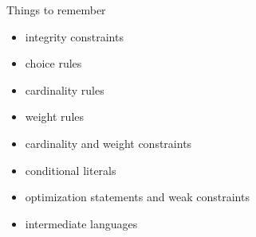\begin{frame}{Things to remember}
  \bigskip
  \begin{itemize}
  \item integrity constraints
  \item choice rules
  \item cardinality rules
  \item weight rules
    \smallskip
  \item cardinality and weight constraints
    \medskip
  \item conditional literals
    \medskip
  \item optimization statements and weak constraints
    \medskip
  \item intermediate languages
  \end{itemize}
\end{frame}
%
